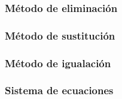 \documentclass[12pt,repaso,answers]{RDS_unit}
\begin{document}
\begin{questions}
	\subsubsection{Método de eliminación}
	\question[1]{}
	\subsubsection{Método de sustitución}
	\question[1]{}
	\subsubsection{Método de igualación}
	\question[1]{}
	\subsubsection{Sistema de ecuaciones}
	\question[1]{}
\end{questions}
\end{document}
